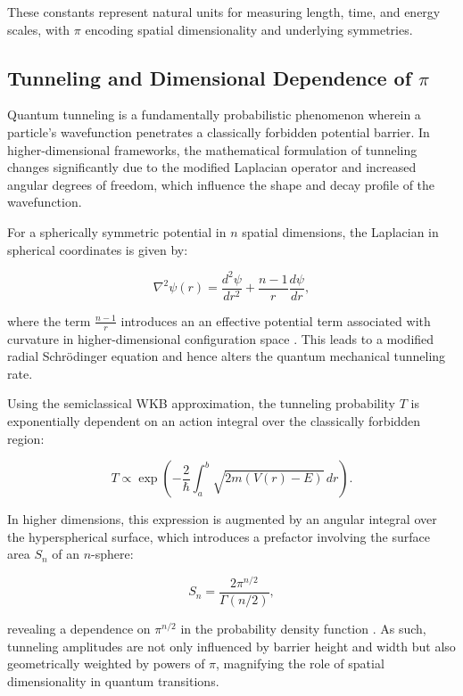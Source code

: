 \documentclass[12pt,a4paper]{article}
\begin{document}
These constants represent natural units for measuring length, time, and energy scales, with \(\pi\) encoding spatial dimensionality and underlying symmetries.


\subsection{Tunneling and Dimensional Dependence of \(\pi\)}

Quantum tunneling is a fundamentally probabilistic phenomenon wherein a particle's wavefunction penetrates a classically forbidden potential barrier. In higher-dimensional frameworks, the mathematical formulation of tunneling changes significantly due to the modified Laplacian operator and increased angular degrees of freedom, which influence the shape and decay profile of the wavefunction.

For a spherically symmetric potential in \(n\) spatial dimensions, the Laplacian in spherical coordinates is given by:

\begin{equation}
\nabla^2 \psi(r) = \frac{d^2 \psi}{dr^2} + \frac{n-1}{r} \frac{d\psi}{dr},
\end{equation}

where the term \(\frac{n-1}{r}\) introduces an an effective potential term associated with curvature in higher-dimensional configuration space \cite{arnold_mathematical_1989,bowman_introduction_1969}. This leads to a modified radial Schrödinger equation and hence alters the quantum mechanical tunneling rate.

Using the semiclassical WKB approximation, the tunneling probability \(T\) is exponentially dependent on an action integral over the classically forbidden region:

\begin{equation}
T \propto \exp\left( - \frac{2}{\hbar} \int_a^b \sqrt{2m (V(r) - E)} \, dr \right).
\end{equation}

In higher dimensions, this expression is augmented by an angular integral over the hyperspherical surface, which introduces a prefactor involving the surface area \(S_n\) of an \(n\)-sphere:

\begin{equation}
S_n = \frac{2 \pi^{n/2}}{\Gamma(n/2)},
\end{equation}

revealing a dependence on \(\pi^{n/2}\) in the probability density function \cite{caruso_wave_2014,milton_casimir_2001,quantum-tunneling-pi-specific}. As such, tunneling amplitudes are not only influenced by barrier height and width but also geometrically weighted by powers of \(\pi\), magnifying the role of spatial dimensionality in quantum transitions.
\end{document}

